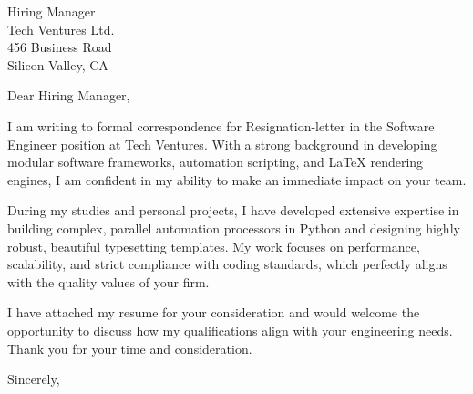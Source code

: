 \documentclass[11pt,a4paper]{letter}
\begin{document}
\begin{letter}{Hiring Manager \\ Tech Ventures Ltd. \\ 456 Business Road \\ Silicon Valley, CA}

\opening{Dear Hiring Manager,}

I am writing to formal correspondence for Resignation-letter in the Software Engineer position at Tech Ventures. With a strong background in developing modular software frameworks, automation scripting, and LaTeX rendering engines, I am confident in my ability to make an immediate impact on your team.

During my studies and personal projects, I have developed extensive expertise in building complex, parallel automation processors in Python and designing highly robust, beautiful typesetting templates. My work focuses on performance, scalability, and strict compliance with coding standards, which perfectly aligns with the quality values of your firm.

I have attached my resume for your consideration and would welcome the opportunity to discuss how my qualifications align with your engineering needs. Thank you for your time and consideration.

\closing{Sincerely,}

\end{letter}
\end{document}
